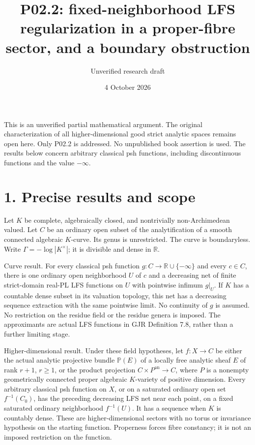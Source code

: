 \documentclass[11pt]{article}
\title{P02.2: fixed-neighborhood LFS regularization in a proper-fibre sector, and a boundary obstruction}
\author{Unverified research draft}
\date{4 October 2026}
\begin{document}
\maketitle

This is an unverified partial mathematical argument. The original characterization of all higher-dimensional good strict analytic spaces remains open here. Only P02.2 is addressed. No unpublished book assertion is used. The results below concern arbitrary classical psh functions, including discontinuous functions and the value $-\infty$.

\section*{1. Precise results and scope}

Let $K$ be complete, algebraically closed, and nontrivially non-Archimedean valued. Let $C$ be an ordinary open subset of the analytification of a smooth connected algebraic $K$-curve. Its genus is unrestricted. The curve is boundaryless. Write $\Gamma=-\log|K^\times|$; it is divisible and dense in $\mathbb R$.

Curve result. For every classical psh function $g:C\to\mathbb R\cup\{-\infty\}$ and every $c\in C$, there is one ordinary open neighborhood $U$ of $c$ and a decreasing net of finite strict-domain real-PL LFS functions on $U$ with pointwise infimum $g|_U$. If $K$ has a countable dense subset in its valuation topology, this net has a decreasing sequence extraction with the same pointwise limit. No continuity of $g$ is assumed. No restriction on the residue field or the residue genera is imposed. The approximants are actual LFS functions in GJR Definition 7.8, rather than a further limiting stage.

Higher-dimensional result. Under these field hypotheses, let $f:X\to C$ be either the actual analytic projective bundle $\mathbb P(E)$ of a locally free analytic sheaf $E$ of rank $r+1$, $r\geq1$, or the product projection $C\times P^{\mathrm{an}}\to C$, where $P$ is a nonempty geometrically connected proper algebraic $K$-variety of positive dimension. Every arbitrary classical psh function on $X$, or on a saturated ordinary open set $f^{-1}(C_0)$, has the preceding decreasing LFS net near each point, on a fixed saturated ordinary neighborhood $f^{-1}(U)$. It has a sequence when $K$ is countably dense. These are higher-dimensional sectors with no torus or invariance hypothesis on the starting function. Properness forces fibre constancy; it is not an imposed restriction on the function.
\end{document}
